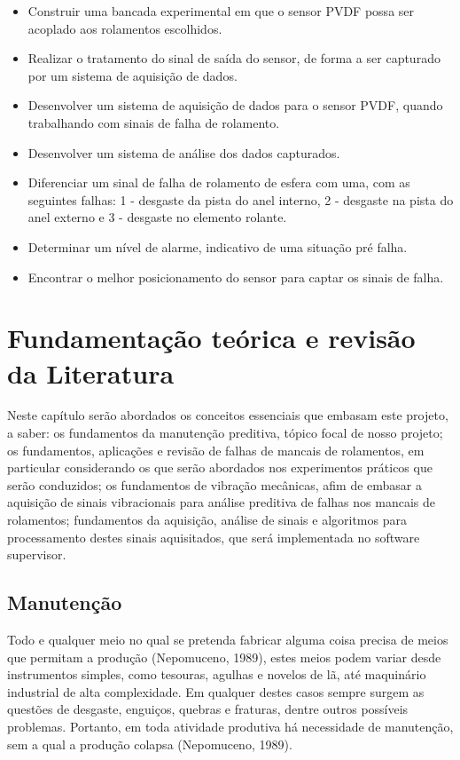 \documentclass[
	12pt,				
	oneside,			
	a4paper,			
	english,			
	brazil				
	]{abntex2ppgsi}
\begin{document}
\begin{itemize}
	\item Construir uma bancada experimental em que o sensor PVDF possa ser acoplado aos rolamentos escolhidos.
	\item Realizar o tratamento do sinal de saída do sensor, de forma a ser capturado por um sistema de aquisição de dados.
	\item Desenvolver um sistema de aquisição de dados para o sensor PVDF, quando trabalhando com sinais de falha de rolamento.
	\item Desenvolver um sistema de análise dos dados capturados.
	\item Diferenciar um sinal de falha de rolamento de esfera com uma, com as seguintes falhas: 1 - desgaste da pista do anel interno, 2 - desgaste na pista do anel externo e 3 - desgaste no elemento rolante.
	\item Determinar um nível de alarme, indicativo de uma situação pré falha.
	\item Encontrar o melhor posicionamento do sensor para captar os sinais de falha.

\end{itemize}

\chapter{Fundamentação teórica e revisão da Literatura}
Neste capítulo serão abordados os conceitos essenciais que embasam este projeto, a saber: os fundamentos da manutenção preditiva, tópico focal de nosso projeto; os fundamentos, aplicações e revisão de falhas de mancais de rolamentos, em particular considerando os que serão abordados nos experimentos práticos que serão conduzidos; os fundamentos de vibração mecânicas, afim de embasar a aquisição de sinais vibracionais para análise preditiva de falhas nos mancais de rolamentos; fundamentos da aquisição, análise de sinais e algoritmos para processamento destes sinais aquisitados, que será implementada no software supervisor.

\section{\textbf{Manutenção}}
Todo e qualquer meio no qual se pretenda fabricar alguma coisa precisa de meios que permitam a produção (Nepomuceno, 1989), estes meios podem variar desde instrumentos simples, como tesouras, agulhas e novelos de lã, até maquinário industrial de alta complexidade. 
Em qualquer destes casos sempre surgem as questões de desgaste, enguiços, quebras e fraturas, dentre outros possíveis problemas. Portanto, em toda atividade produtiva  há necessidade de manutenção, sem a qual a produção colapsa (Nepomuceno, 1989).
\end{document}

